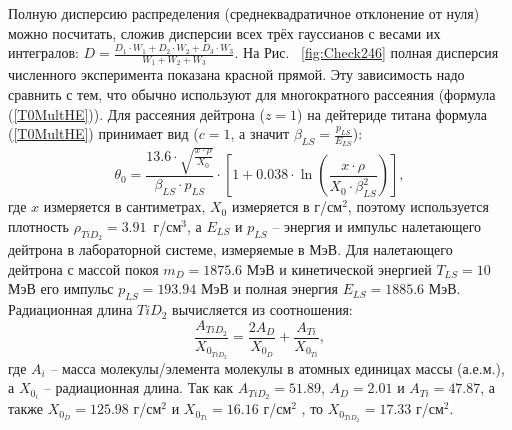 \documentclass[a4paper,12pt]{article}
\begin{document}
\begin{large}
  Полную дисперсию распределения (среднеквадратичное отклонение от нуля) можно посчитать, сложив дисперсии всех трёх гауссианов с весами их интегралов: $D=\frac{D_1\cdot W_1+D_2\cdot W_2+D_3\cdot W_3}{W_1+W_2+W_3}$.
  На Рис. ~\ref{fig:Check246} полная дисперсия численного эксперимента показана красной прямой.
  Эту зависимость надо сравнить с тем, что обычно используют для многократного рассеяния (формула (\ref{T0MultHE})).  
  Для рассеяния дейтрона ($z=1$) на дейтериде титана формула (\ref{T0MultHE}) принимает вид ($c=1$, а значит $\beta_{LS}=\frac{p_{LS}}{E_{LS}}$):
\begin{equation}
  \label{CheckTheta0Coefficient}
  \theta_0=\frac{13.6 \cdot \sqrt{\frac{x\cdot \rho}{X_0}}}{\beta_{LS}\cdot p_{LS}}\cdot\left[ 1+0.038\cdot\ln\left(\frac{x\cdot \rho}{X_0\cdot \beta^2_{LS}}\right)\right],
\end{equation}
где $x$ измеряется в сантиметрах, $X_0$ измеряется в г/см$^2$, поэтому используется плотность $\rho_{TiD_2}=3.91$~г/см$^3$, а $E_{LS}$ и $p_{LS}$ -- энергия и импульс налетающего дейтрона в лабораторной системе, измеряемые в МэВ. Для налетающего дейтрона с массой покоя $m_D=1875.6$ МэВ и кинетической энергией $T_{LS}=10$ МэВ его импульс $p_{LS}=193.94$ МэВ и полная энергия $E_{LS}=1885.6$ МэВ. Радиационная длина $TiD_2$ вычисляется из соотношения:
\begin{equation}
  \label{RadLength}
  \frac{A_{TiD_2}}{X_{0_{TiD_2}}}=\frac{2 A_{D}}{X_{0_{D}}}+\frac{A_{Ti}}{X_{0_{Ti}}},
\end{equation}
где $A_i$ -- масса молекулы/элемента молекулы в атомных единицах массы (а.е.м.), а $X_{0_i}$ -- радиационная длина.
  Так как $A_{TiD_2}=51.89$, $A_{D}=2.01$ и $A_{Ti}=47.87$, а также $X_{0_{D}}=125.98$ г/см$^2$ и $X_{0_{Ti}}=16.16$ г/см$^2$ \cite{PDG}, то $X_{0_{TiD_2}}=17.33$ г/см$^2$.


\end{large}
\end{document}
